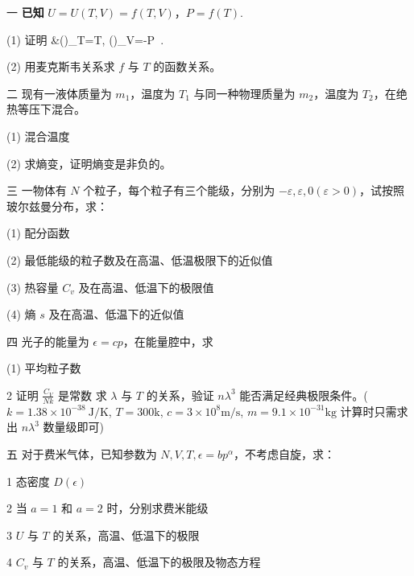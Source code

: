 一 \textbf{已知} $U = U(T, V) = f(T, V)$，$P = f(T)$.

(1) 证明
&\left(\right)_T=T, \left(\right)_V=-P~.

(2) 用麦克斯韦关系求 $f$ 与 $T$ 的函数关系。

二 现有一液体质量为 $m_1$，温度为 $T_1$ 与同一种物理质量为 $m_2$，温度为 $T_2$，在绝热等压下混合。

(1) 混合温度

(2) 求熵变，证明熵变是非负的。

三 一物体有 $N$ 个粒子，每个粒子有三个能级，分别为 $-\varepsilon, \varepsilon, 0 (\varepsilon > 0)$，试按照玻尔兹曼分布，求：

(1) 配分函数

(2) 最低能级的粒子数及在高温、低温极限下的近似值

(3) 热容量 $C_v$ 及在高温、低温下的极限值

(4) 熵 $s$ 及在高温、低温下的近似值

四 光子的能量为 $\epsilon = cp$，在能量腔中，求

(1) 平均粒子数

{2} 证明 $\frac{C_V}{Nk}$ 是常数
求 $\lambda$ 与 $T$ 的关系，验证 $n \lambda^3$ 能否满足经典极限条件。($k=1.38 \times 10^{-38} \ \text{J/K}$, $T=300 \text{k}$, $c=3 \times 10^8 \text{m/s}$, $m=9.1 \times 10^{-31} \text{kg}$ 计算时只需求出 $n \lambda^3$ 数量级即可)



五 对于费米气体，已知参数为 $N, V, T, \epsilon = b p^\alpha$，不考虑自旋，求：


{1} 态密度 $D(\epsilon)$

{2} 当 $a=1$ 和 $a=2$ 时，分别求费米能级

{3} $U$ 与 $T$ 的关系，高温、低温下的极限

{4} $C_v$ 与 $T$ 的关系，高温、低温下的极限及物态方程